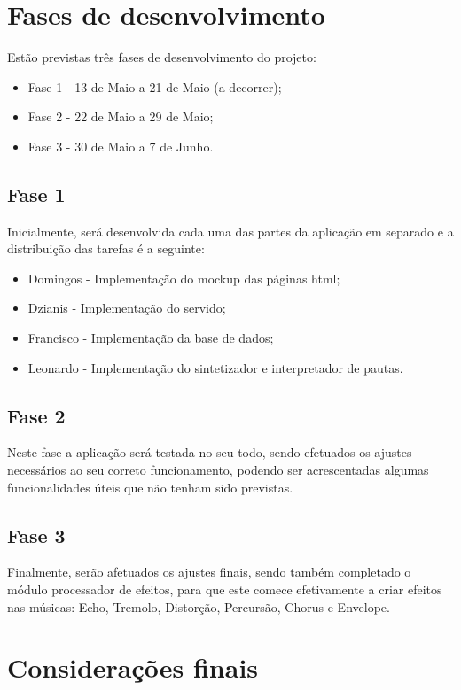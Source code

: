 \documentclass{report}
\begin{document}
\chapter{Fases de desenvolvimento}
\label{chap.fases}
Estão previstas três fases de desenvolvimento do projeto:

\begin{itemize}
\item Fase 1 - 13 de Maio a 21 de Maio (a decorrer);
\item Fase 2 - 22 de Maio a 29 de Maio;
\item Fase 3 - 30 de Maio a 7 de Junho.
\end{itemize}

\section{Fase 1}
Inicialmente, será desenvolvida cada uma das partes da aplicação em separado e a distribuição das tarefas é a seguinte:
\begin{itemize}
\item Domingos - Implementação do mockup das páginas \ac{html};
\item Dzianis - Implementação do servido;
\item Francisco - Implementação da base de dados;
\item Leonardo - Implementação do sintetizador e interpretador de pautas.
\end{itemize}
\section{Fase 2}
Neste fase a aplicação será testada no seu todo, sendo efetuados os ajustes necessários ao seu correto funcionamento, podendo ser acrescentadas algumas funcionalidades úteis que não tenham sido previstas.
\section{Fase 3}
Finalmente, serão afetuados os ajustes finais, sendo também completado o módulo processador de efeitos, para que este comece efetivamente a criar efeitos nas músicas: Echo, Tremolo, Distorção, Percursão, Chorus e Envelope.

\chapter{Considerações finais}
\label{chap.finais}
\end{document}
